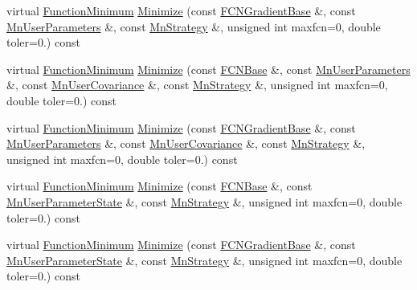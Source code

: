\begin{DoxyCompactItemize}
\item 
virtual \mbox{\hyperlink{classROOT_1_1Minuit2_1_1FunctionMinimum}{Function\+Minimum}} \mbox{\hyperlink{classROOT_1_1Minuit2_1_1ModularFunctionMinimizer_a0340c3524916d898de2a4ac4364452ad}{Minimize}} (const \mbox{\hyperlink{classROOT_1_1Minuit2_1_1FCNGradientBase}{F\+C\+N\+Gradient\+Base}} \&, const \mbox{\hyperlink{classROOT_1_1Minuit2_1_1MnUserParameters}{Mn\+User\+Parameters}} \&, const \mbox{\hyperlink{classROOT_1_1Minuit2_1_1MnStrategy}{Mn\+Strategy}} \&, unsigned int maxfcn=0, double toler=0.) const
\item 
virtual \mbox{\hyperlink{classROOT_1_1Minuit2_1_1FunctionMinimum}{Function\+Minimum}} \mbox{\hyperlink{classROOT_1_1Minuit2_1_1ModularFunctionMinimizer_a8db208c6cdcef4c527781732ee613436}{Minimize}} (const \mbox{\hyperlink{classROOT_1_1Minuit2_1_1FCNBase}{F\+C\+N\+Base}} \&, const \mbox{\hyperlink{classROOT_1_1Minuit2_1_1MnUserParameters}{Mn\+User\+Parameters}} \&, const \mbox{\hyperlink{classROOT_1_1Minuit2_1_1MnUserCovariance}{Mn\+User\+Covariance}} \&, const \mbox{\hyperlink{classROOT_1_1Minuit2_1_1MnStrategy}{Mn\+Strategy}} \&, unsigned int maxfcn=0, double toler=0.) const
\item 
virtual \mbox{\hyperlink{classROOT_1_1Minuit2_1_1FunctionMinimum}{Function\+Minimum}} \mbox{\hyperlink{classROOT_1_1Minuit2_1_1ModularFunctionMinimizer_afcfe05cabceaab80b036f5b809c6de32}{Minimize}} (const \mbox{\hyperlink{classROOT_1_1Minuit2_1_1FCNGradientBase}{F\+C\+N\+Gradient\+Base}} \&, const \mbox{\hyperlink{classROOT_1_1Minuit2_1_1MnUserParameters}{Mn\+User\+Parameters}} \&, const \mbox{\hyperlink{classROOT_1_1Minuit2_1_1MnUserCovariance}{Mn\+User\+Covariance}} \&, const \mbox{\hyperlink{classROOT_1_1Minuit2_1_1MnStrategy}{Mn\+Strategy}} \&, unsigned int maxfcn=0, double toler=0.) const
\item 
virtual \mbox{\hyperlink{classROOT_1_1Minuit2_1_1FunctionMinimum}{Function\+Minimum}} \mbox{\hyperlink{classROOT_1_1Minuit2_1_1ModularFunctionMinimizer_a1ae6ed90bc87c3db98388f3d26980a51}{Minimize}} (const \mbox{\hyperlink{classROOT_1_1Minuit2_1_1FCNBase}{F\+C\+N\+Base}} \&, const \mbox{\hyperlink{classROOT_1_1Minuit2_1_1MnUserParameterState}{Mn\+User\+Parameter\+State}} \&, const \mbox{\hyperlink{classROOT_1_1Minuit2_1_1MnStrategy}{Mn\+Strategy}} \&, unsigned int maxfcn=0, double toler=0.) const
\item 
virtual \mbox{\hyperlink{classROOT_1_1Minuit2_1_1FunctionMinimum}{Function\+Minimum}} \mbox{\hyperlink{classROOT_1_1Minuit2_1_1ModularFunctionMinimizer_a2e1e21161544b931511204cdedac914d}{Minimize}} (const \mbox{\hyperlink{classROOT_1_1Minuit2_1_1FCNGradientBase}{F\+C\+N\+Gradient\+Base}} \&, const \mbox{\hyperlink{classROOT_1_1Minuit2_1_1MnUserParameterState}{Mn\+User\+Parameter\+State}} \&, const \mbox{\hyperlink{classROOT_1_1Minuit2_1_1MnStrategy}{Mn\+Strategy}} \&, unsigned int maxfcn=0, double toler=0.) const

\end{DoxyCompactItemize}
